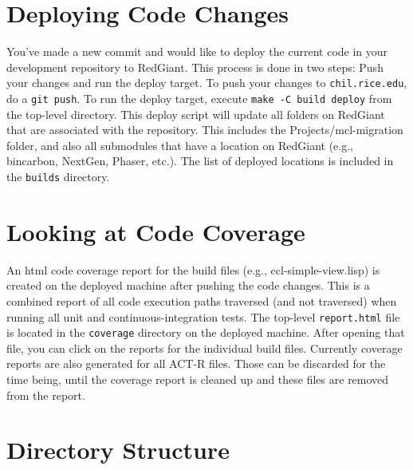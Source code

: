 \documentclass[12pt]{article} %
\newcommand{\code}[1]{\texttt{#1}}
\newcommand{\filesys}[1]{\texttt{#1}}
\begin{document}
\section{Deploying Code Changes}

You've made a new commit and would like to deploy the current code in your development repository to RedGiant.
This process is done in two steps: Push your changes and run the deploy target.
To push your changes to \filesys{chil.rice.edu}, do a \code{git push}.
To run the deploy target, execute \code{make -C build deploy} from the top-level directory.
This deploy script will update all folders on RedGiant that are associated with the repository.
This includes the Projects/mcl-migration folder, and also all submodules that have a location on RedGiant (e.g., bincarbon, NextGen, Phaser, etc.).
The list of deployed locations is included in the \filesys{builds} directory.

\section{Looking at Code Coverage}

An html code coverage report for the build files (e.g., ccl-simple-view.lisp) is created on the deployed machine after pushing the code changes.
This is a combined report of all code execution paths traversed (and not traversed) when running all unit and continuous-integration tests.
The top-level \filesys{report.html} file is located in the \filesys{coverage} directory on the deployed machine.
After opening that file, you can click on the reports for the individual build files.
Currently coverage reports are also generated for all ACT-R files.
Those can be discarded for the time being, until the coverage report is cleaned up and these files are removed from the report.

\section{Directory Structure} %
\end{document}
